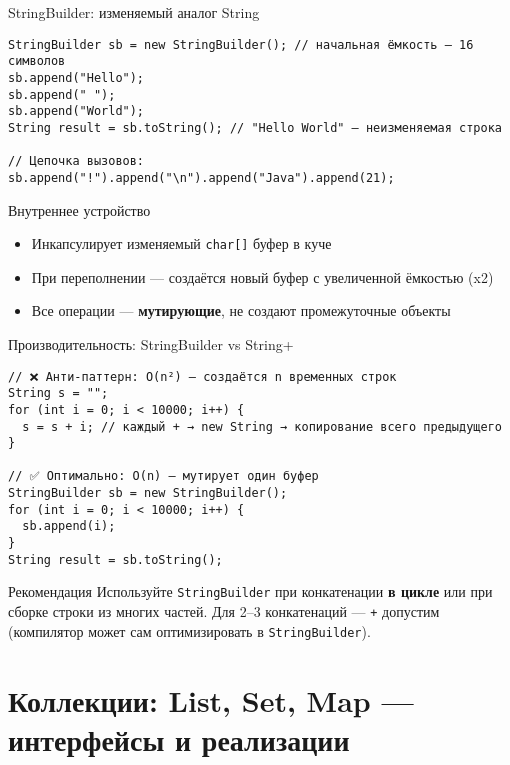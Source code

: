 \documentclass[aspectratio=169]{beamer}
\begin{document}
\begin{frame}[fragile]{StringBuilder: изменяемый аналог String}
\lstset{language=JavaLite}
\begin{lstlisting}
StringBuilder sb = new StringBuilder(); // начальная ёмкость — 16 символов
sb.append("Hello");
sb.append(" ");
sb.append("World");
String result = sb.toString(); // "Hello World" — неизменяемая строка

// Цепочка вызовов:
sb.append("!").append("\n").append("Java").append(21);
\end{lstlisting}
  \begin{block}{Внутреннее устройство}
    \begin{itemize}
      \item Инкапсулирует изменяемый \texttt{char[]} буфер в куче
      \item При переполнении — создаётся новый буфер с увеличенной ёмкостью (x2)
      \item Все операции — \textbf{мутирующие}, не создают промежуточные объекты
    \end{itemize}
  \end{block}
\end{frame}

\begin{frame}[fragile]{Производительность: StringBuilder vs String+}
\lstset{language=JavaLite}
\begin{lstlisting}
// ❌ Анти-паттерн: O(n²) — создаётся n временных строк
String s = "";
for (int i = 0; i < 10000; i++) {
  s = s + i; // каждый + → new String → копирование всего предыдущего
}

// ✅ Оптимально: O(n) — мутирует один буфер
StringBuilder sb = new StringBuilder();
for (int i = 0; i < 10000; i++) {
  sb.append(i);
}
String result = sb.toString();
\end{lstlisting}
  \begin{block}{Рекомендация}
    Используйте \texttt{StringBuilder} при конкатенации \textbf{в цикле} или при сборке строки из многих частей.  
    Для 2–3 конкатенаций — \texttt{+} допустим (компилятор может сам оптимизировать в \texttt{StringBuilder}).
  \end{block}
\end{frame}

\section{Коллекции: List, Set, Map — интерфейсы и реализации}
\end{document}
